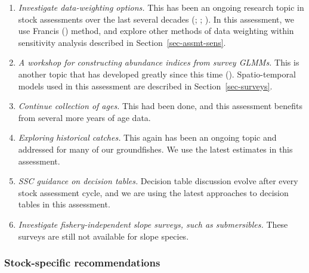 \documentclass[
]{scrartcl}
\providecommand{\tightlist}{%
  \setlength{\itemsep}{0pt}\setlength{\parskip}{0pt}}\usepackage{longtable,booktabs,array}
\begin{document}
\begin{enumerate}
\def\labelenumi{\arabic{enumi}.}
\tightlist
\item
  \emph{Investigate data-weighting options.} This has been an ongoing
  research topic in stock assessments over the last several decades
  (;
  ;
  ). In
  this assessment, we use Francis
  () method, and explore other
  methods of data weighting within sensitivity analysis described in
  Section~\ref{sec-assmt-sens}.
\item
  \emph{A workshop for constructing abundance indices from survey
  GLMMs.} This is another topic that has developed greatly since this
  time (). Spatio-temporal models used in this assessment are described
  in Section~\ref{sec-surveys}.
\item
  \emph{Continue collection of ages.} This had been done, and this
  assessment benefits from several more years of age data.
\item
  \emph{Exploring historical catches.} This again has been an ongoing
  topic and addressed for many of our groundfishes. We use the latest
  estimates in this assessment.
\item
  \emph{SSC guidance on decision tables.} Decision table discussion
  evolve after every stock assessment cycle, and we are using the latest
  approaches to decision tables in this assessment.
\item
  \emph{Investigate fishery-independent slope surveys, such as
  submersibles.} These surveys are still not available for slope
  species.
\end{enumerate}

\subsubsection{Stock-specific
recommendations}\label{stock-specific-recommendations}
\end{document}

